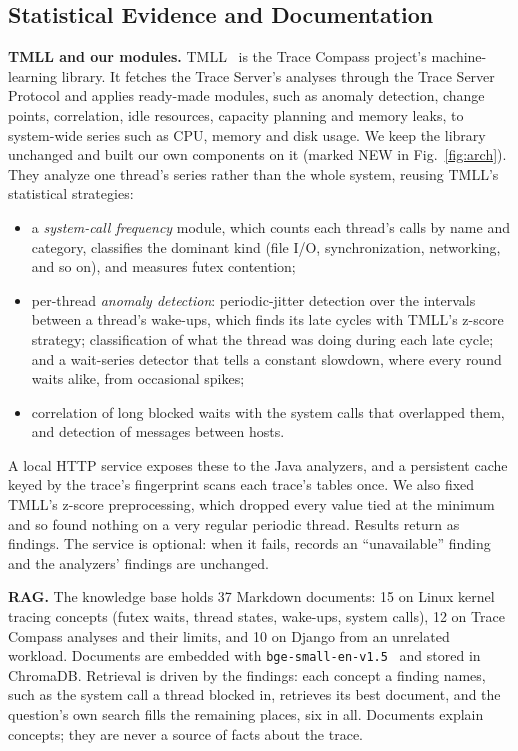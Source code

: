 \subsection{Statistical Evidence and Documentation}

\textbf{TMLL and our modules.} TMLL~\cite{shahedi2025tmll} is the Trace Compass project's machine-learning library. It fetches the Trace Server's analyses through the Trace Server Protocol and applies ready-made modules, such as anomaly detection, change points, correlation, idle resources, capacity planning and memory leaks, to system-wide series such as CPU, memory and disk usage. We keep the library unchanged and built our own components on it (marked NEW in Fig.~\ref{fig:arch}). They analyze one thread's series rather than the whole system, reusing TMLL's statistical strategies:
\begin{itemize}
  \item a \emph{system-call frequency} module, which counts each thread's calls by name and category, classifies the dominant kind (file I/O, synchronization, networking, and so on), and measures futex contention;
  \item per-thread \emph{anomaly detection}: periodic-jitter detection over the intervals between a thread's wake-ups, which finds its late cycles with TMLL's z-score strategy; classification of what the thread was doing during each late cycle; and a wait-series detector that tells a constant slowdown, where every round waits alike, from occasional spikes;
  \item correlation of long blocked waits with the system calls that overlapped them, and detection of messages between hosts.
\end{itemize}
A local HTTP service exposes these to the Java analyzers, and a persistent cache keyed by the trace's fingerprint scans each trace's tables once. We also fixed TMLL's z-score preprocessing, which dropped every value tied at the minimum and so found nothing on a very regular periodic thread. Results return as findings. The service is optional: when it fails, \sysname records an ``unavailable'' finding and the analyzers' findings are unchanged.

\textbf{RAG.} The knowledge base holds 37 Markdown documents: 15 on Linux kernel tracing concepts (futex waits, thread states, wake-ups, system calls), 12 on Trace Compass analyses and their limits, and 10 on Django from an unrelated workload. Documents are embedded with \texttt{bge-small-en-v1.5}~\cite{xiao2023cpack} and stored in ChromaDB. Retrieval is driven by the findings: each concept a finding names, such as the system call a thread blocked in, retrieves its best document, and the question's own search fills the remaining places, six in all. Documents explain concepts; they are never a source of facts about the trace.

